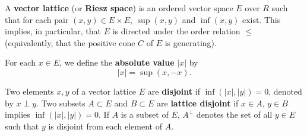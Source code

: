 A \textbf{vector lattice} (or \textbf{Riesz space}) is an ordered vector space $E$ over $R$ such that for each pair $(x, y) \in E \times E$, $\sup(x, y)$ and $\inf(x, y)$ exist. This implies, in particular, that $E$ is directed under the order relation $\leq$ (equivalently, that the positive cone $C$ of $E$ is generating).

For each $x \in E$, we define the \textbf{absolute value} $|x|$ by
$$|x| = \sup(x, -x).$$

Two elements $x, y$ of a vector lattice $E$ are \textbf{disjoint} if $\inf(|x|, |y|) = 0$, denoted by $x \perp y$. Two subsets $A \subset E$ and $B \subset E$ are \textbf{lattice disjoint} if $x \in A$, $y \in B$ implies $\inf(|x|, |y|) = 0$. If $A$ is a subset of $E$, $A^\perp$ denotes the set of all $y \in E$ such that $y$ is disjoint from each element of $A$.
